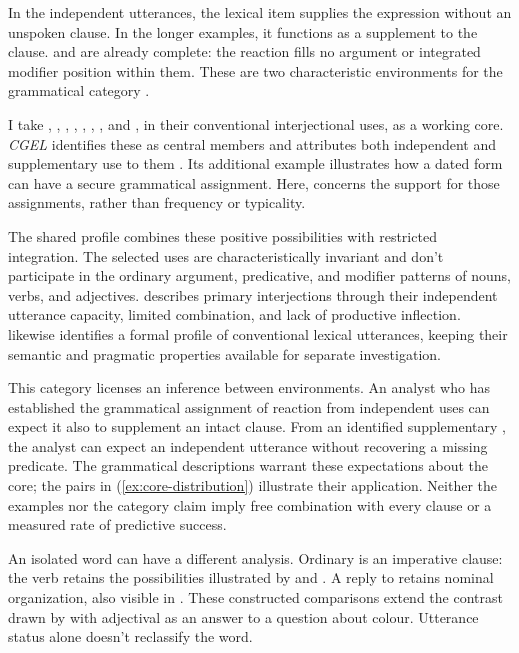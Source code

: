 \documentclass[12pt]{article}
\begin{document}
In the independent utterances, the lexical item supplies the expression
without an unspoken clause. In the longer examples, it functions as
a supplement to the clause.  and  are already complete: the reaction fills no argument or integrated
modifier position within them. These are two characteristic environments
for the grammatical category .

I take , , , ,
, , , and , in
their conventional interjectional uses, as a working core. \textit{CGEL}
identifies these as central members and attributes both independent
and supplementary use to them \citep[1361]{HuddlestonPullum2002}.
Its additional example  illustrates how a dated form
can have a secure grammatical assignment. Here,  concerns
the support for those assignments, rather than frequency or typicality.

The shared profile combines these positive possibilities with restricted
integration. The selected uses are characteristically invariant and don't
participate in the ordinary argument, predicative, and modifier patterns
of nouns, verbs, and adjectives. \textcite[105--106]{ameka1992} describes
primary interjections through their independent utterance capacity, limited
combination, and lack of productive inflection. \textcite[124--125]{wilkins1992}
likewise identifies a formal profile of conventional lexical utterances,
keeping their semantic and pragmatic properties available for separate
investigation.

This category licenses an inference between environments. An analyst who
has established the grammatical assignment of reaction 
from independent uses can expect it also to supplement an intact
clause. From an identified supplementary , the analyst can
expect an independent utterance without recovering a missing predicate.
The grammatical descriptions warrant these expectations about the core;
the pairs in (\ref{ex:core-distribution}) illustrate their application.
Neither the examples nor the category claim imply free combination
with every clause or a measured rate of predictive success.

An isolated word can have a different analysis. Ordinary 
is an imperative clause: the verb retains the possibilities illustrated
by  and . A reply
 to  retains nominal
organization, also visible in . These constructed
comparisons extend the contrast drawn by \textcite[124--125]{wilkins1992}
with adjectival  as an answer to a question about colour.
Utterance status alone doesn't reclassify the word.
\end{document}
